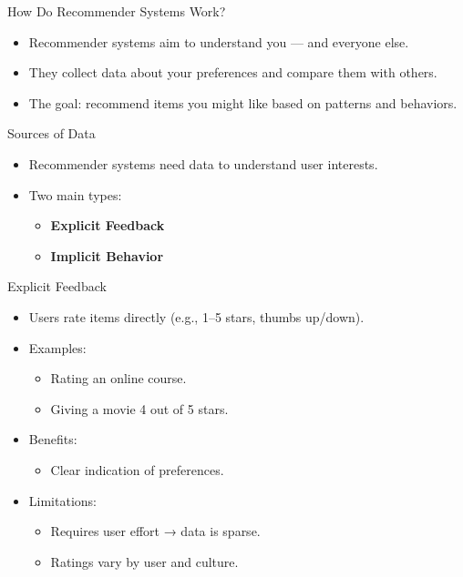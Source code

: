 \documentclass{beamer}
\begin{document}
\begin{frame}{How Do Recommender Systems Work?}
\begin{itemize}
    \item Recommender systems aim to understand you — and everyone else.
    \item They collect data about your preferences and compare them with others.
    \item The goal: recommend items you might like based on patterns and behaviors.
\end{itemize}
\end{frame}

\begin{frame}{Sources of Data}
\begin{itemize}
    \item Recommender systems need data to understand user interests.
    \item Two main types:
    \begin{itemize}
        \item \textbf{Explicit Feedback}
        \item \textbf{Implicit Behavior}
    \end{itemize}
\end{itemize}
\end{frame}

\begin{frame}{Explicit Feedback}
\begin{itemize}
    \item Users rate items directly (e.g., 1–5 stars, thumbs up/down).
    \item Examples:
    \begin{itemize}
        \item Rating an online course.
        \item Giving a movie 4 out of 5 stars.
    \end{itemize}
    \item Benefits:
    \begin{itemize}
        \item Clear indication of preferences.
    \end{itemize}
    \item Limitations:
    \begin{itemize}
        \item Requires user effort → data is sparse.
        \item Ratings vary by user and culture.
    \end{itemize}
\end{itemize}
\end{frame}
\end{document}
